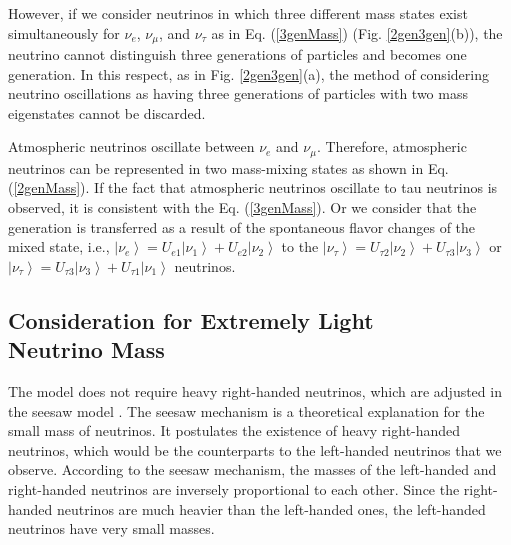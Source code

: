 \documentclass[%
 reprint,
 amsmath,amssymb,
 aps,
]{revtex4-1}
\numberwithin{equation}{section}%
\begin{document}
However, if we consider neutrinos in which three different mass states exist simultaneously for $\nu_e$, $\nu_{\mu}$, and $\nu_{\tau}$ as in Eq. (\ref{3genMass}) (Fig. \ref{2gen3gen}(b)), the neutrino cannot distinguish three generations of particles and becomes one generation. In this respect, as in Fig. \ref{2gen3gen}(a), the method of considering neutrino oscillations as having three generations of particles with two mass eigenstates cannot be discarded.



Atmospheric neutrinos oscillate \cite{Pontecorvo1967} between $\nu_e$ and $\nu_{\mu}$. Therefore, atmospheric neutrinos can be represented in two mass-mixing states as shown in Eq. (\ref{2genMass}). If the fact that atmospheric neutrinos oscillate \cite{Kajita1998} to tau neutrinos is observed, it is consistent with the Eq. (\ref{3genMass}). Or
we consider that the generation is transferred as a result of the spontaneous flavor changes of the mixed state, i.e., $\left|\nu_e\right\rangle=U_{e 1}\left|\nu_1\right\rangle+U_{e 2}\left|\nu_2\right\rangle$ to the $\left|\nu_\tau\right\rangle=U_{\tau 2}\left|\nu_2\right\rangle+U_{\tau 3}\left|\nu_3\right\rangle$ or $\left|\nu_\tau\right\rangle=U_{\tau 3}\left|\nu_3\right\rangle+U_{\tau 1}\left|\nu_1\right\rangle$ neutrinos.




\subsection{Consideration for Extremely Light \\Neutrino Mass}


The model does not require heavy right-handed neutrinos, which are adjusted in the seesaw model \cite{Yanagida}. The seesaw mechanism is a theoretical explanation for the small mass of neutrinos. It postulates the existence of heavy right-handed neutrinos, which would be the counterparts to the left-handed neutrinos that we observe. According to the seesaw mechanism, the masses of the left-handed and right-handed neutrinos are inversely proportional to each other. Since the right-handed neutrinos are much heavier than the left-handed ones, the left-handed neutrinos have very small masses.
\end{document}
